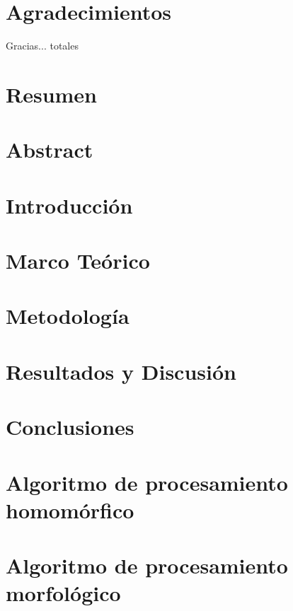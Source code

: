 \documentclass[11pt,a4paper]{report}
\begin{document}
\chapter*{Agradecimientos}
Gracias... totales
\chapter*{Resumen}  %

\chapter*{Abstract} %


\justifying
\setlength{\parindent}{20pt}
\chapter{Introducción}  
    
\chapter{Marco Teórico}
    
\chapter{Metodología}               \label{Metodología}
    
\chapter{Resultados y Discusión}    \label{Resultados}
    
\chapter{Conclusiones}      
    
\appendix
\chapter{Algoritmo de procesamiento homomórfico}
%


\chapter{Algoritmo de procesamiento morfológico}
   
\end{document}
